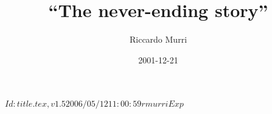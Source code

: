 \RCSID $Id: title.tex,v 1.5 2006/05/12 11:00:59 rmurri Exp $


\title{``The never-ending story''}
\date{2001-12-21}
\author{Riccardo Murri}
\address{%
  Scuola Normale Superiore \\
  p.za dei Cavalieri, 7 \\
  56127 Pisa \\
  Italy
  }

\maketitle

\setcounter{tocdepth}{2} %

\tableofcontents

